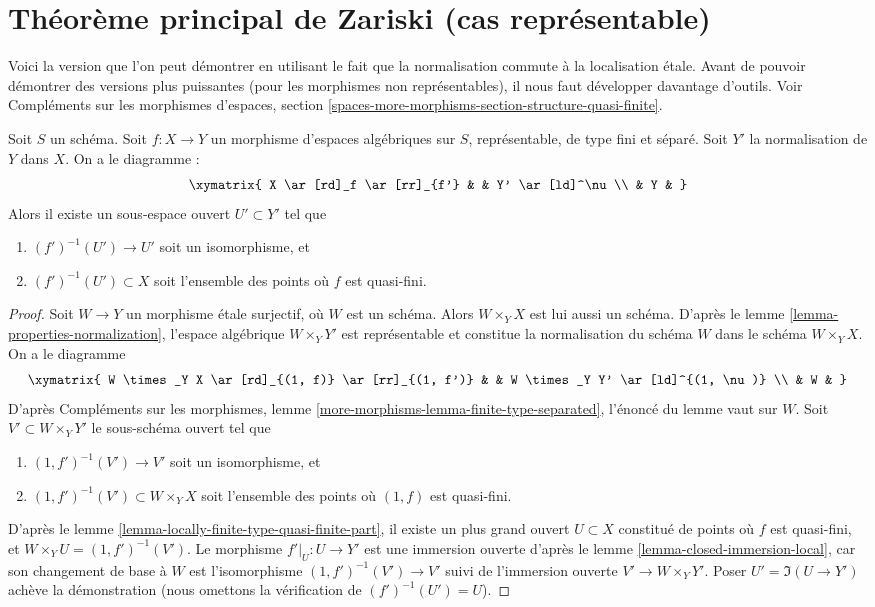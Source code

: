 \section{Théorème principal de Zariski (cas représentable)}
\label{section-Zariski}

\noindent
Voici la version que l'on peut démontrer en utilisant le fait que la normalisation
commute à la localisation étale. Avant de pouvoir démontrer des versions
plus puissantes (pour les morphismes non représentables), il nous faut
développer davantage d'outils. Voir
Compléments sur les morphismes d'espaces, section
\ref{spaces-more-morphisms-section-structure-quasi-finite}.

\begin{lemma}
\label{lemma-finite-type-separated}
Soit $S$ un schéma. Soit $f : X \to Y$ un morphisme d'espaces
algébriques sur $S$, représentable, de type fini et séparé.
Soit $Y'$ la normalisation de $Y$ dans $X$. On a le diagramme :
$$
\xymatrix{
X \ar[rd]_f \ar[rr]_{f'} & & Y' \ar[ld]^\nu \\
& Y &
}
$$
Alors il existe un sous-espace ouvert $U' \subset Y'$ tel que
\begin{enumerate}
\item $(f')^{-1}(U') \to U'$ soit un isomorphisme, et
\item $(f')^{-1}(U') \subset X$ soit l'ensemble des points où
$f$ est quasi-fini.
\end{enumerate}
\end{lemma}

\begin{proof}
Soit $W \to Y$ un morphisme étale surjectif, où $W$ est un schéma.
Alors $W \times_Y X$ est lui aussi un schéma. D'après le
lemme \ref{lemma-properties-normalization},
l'espace algébrique $W \times_Y Y'$ est représentable et constitue
la normalisation du schéma $W$ dans le schéma $W \times_Y X$. On a le diagramme
$$
\xymatrix{
W \times_Y X \ar[rd]_{(1, f)} \ar[rr]_{(1, f')} & &
W \times_Y Y' \ar[ld]^{(1, \nu)} \\
& W &
}
$$
D'après Compléments sur les morphismes, lemme \ref{more-morphisms-lemma-finite-type-separated},
l'énoncé du lemme vaut sur $W$. Soit $V' \subset W \times_Y Y'$
le sous-schéma ouvert tel que
\begin{enumerate}
\item $(1, f')^{-1}(V') \to V'$ soit un isomorphisme, et
\item $(1, f')^{-1}(V') \subset W \times_Y X$ soit l'ensemble des points où
$(1, f)$ est quasi-fini.
\end{enumerate}
D'après le lemme \ref{lemma-locally-finite-type-quasi-finite-part},
il existe un plus grand ouvert $U \subset X$ constitué de points où $f$
est quasi-fini, et $W \times_Y U = (1, f')^{-1}(V')$.
Le morphisme $f'|_U : U \to Y'$ est une immersion ouverte
d'après le lemme \ref{lemma-closed-immersion-local},
car son changement de base à $W$ est l'isomorphisme $(1, f')^{-1}(V') \to V'$
suivi de l'immersion ouverte $V' \to W \times_Y Y'$.
Poser $U' = \Im(U \to Y')$ achève la démonstration
(nous omettons la vérification de $(f')^{-1}(U') = U$).
\end{proof}

